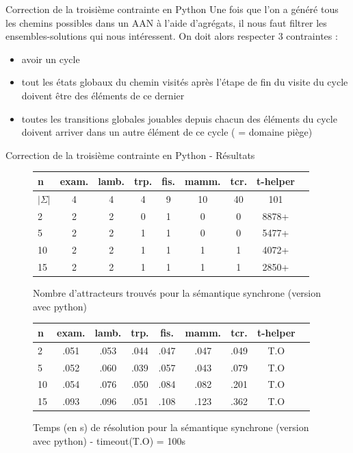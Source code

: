\documentclass{beamer}
\begin{document}
\begin{frame}{Correction de la troisième contrainte en Python}
	\pause
	Une fois que l'on a généré tous les chemins possibles dans un AAN à l'aide d'agrégats, il nous faut filtrer les ensembles-solutions qui nous intéressent. On doit alors respecter 3 contraintes : \\
	\begin{itemize}
		\pause
		\item avoir un cycle
		\pause
		\item tout les états globaux du chemin visités après l'étape de fin du visite du cycle doivent être des éléments de ce dernier
		\pause
		\item toutes les transitions globales jouables depuis chacun des éléments du cycle doivent arriver dans un autre élément de ce cycle ( = domaine piège)\\
	\end{itemize}
\end{frame}

\begin{frame}{Correction de la troisième contrainte en Python - Résultats}
	\begin{figure}[!h]
		\begin{tabular}{l|c<{\onslide<2->}c<{\onslide<3->}c<{\onslide<4->}c<{\onslide<5->}c<{\onslide<6->}c<{\onslide<7->}c<{\onslide}c}
			n & exam. & lamb. & trp. & fis. & mamm. & tcr. & t-helper \\ \hline
			$|\Sigma|$ & 4 & 4 & 4 & 9 & 10 & 40 & 101\\ \hline
			2     & 2 & 2 & 0 & 1 & 0 & 0 & 8878+\\
			5     & 2 & 2 & 1 & 1 & 0 & 0 & 5477+\\
			10    & 2 & 2 & 1 & 1 & 1 & 1 & 4072+\\
			15    & 2 & 2 & 1 & 1 & 1 & 1 & 2850+
		\end{tabular}
		\caption{Nombre d'attracteurs trouvés pour la sémantique synchrone (version avec python)}
		\label{label-figure5}
	\end{figure}
	
	\begin{figure}[!h]
		\begin{tabular}{l|c<{\onslide<2->}c<{\onslide<3->}c<{\onslide<4->}c<{\onslide<5->}c<{\onslide<6->}c<{\onslide<7->}c<{\onslide}c}
			n & exam. & lamb. & trp. & fis. & mamm. & tcr. & t-helper \\ \hline
			2     & .051 & .053 & .044 & .047 & .047 & .049 & T.O\\
			5     & .052 & .060 & .039 & .057 & .043 & .079 & T.O\\
			10    & .054 & .076 & .050 & .084 & .082 & .201 & T.O\\
			15    & .093 & .096 & .051 & .108 & .123 & .362 & T.O
		\end{tabular}
		\caption{Temps (en s) de résolution pour la sémantique synchrone (version avec python) - timeout(T.O) = 100s}
		\label{label-figure6}
	\end{figure}
\end{frame}
\end{document}
